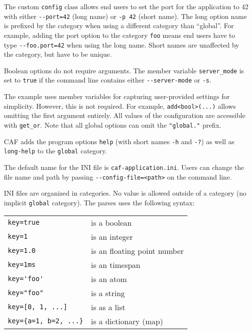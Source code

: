 The custom \lstinline^config^ class allows end users to set the port for the
application to 42 with either \lstinline^--port=42^ (long name) or \lstinline^-p
42^ (short name). The long option name is prefixed by the category when using a
different category than ``global''. For example, adding the port option to the
category \lstinline^foo^ means end users have to type \lstinline^--foo.port=42^
when using the long name. Short names are unaffected by the category, but have
to be unique.

Boolean options do not require arguments. The member variable
\lstinline^server_mode^ is set to \lstinline^true^ if the command line contains
either \lstinline^--server-mode^ or \lstinline^-s^.

The example uses member variables for capturing user-provided settings for
simplicity. However, this is not required. For example,
\lstinline^add<bool>(...)^ allows omitting the first argument entirely. All
values of the configuration are accessible with \lstinline^get_or^. Note that
all global options can omit the \lstinline^"global."^ prefix.

CAF adds the program options \lstinline^help^ (with short names \lstinline^-h^
and \lstinline^-?^) as well as \lstinline^long-help^ to the \lstinline^global^
category.

The default name for the INI file is \lstinline^caf-application.ini^. Users can
change the file name and path by passing \lstinline^--config-file=<path>^ on the
command line.

INI files are organized in categories. No value is allowed outside of a category
(no implicit \lstinline^global^ category). The parses uses the following syntax:

\begin{tabular}{ll}
  \lstinline^key=true^ & is a boolean \\
  \lstinline^key=1^ & is an integer \\
  \lstinline^key=1.0^ & is an floating point number \\
  \lstinline^key=1ms^ & is an timespan \\
  \lstinline^key='foo'^ & is an atom \\
  \lstinline^key="foo"^ & is a string \\
  \lstinline^key=[0, 1, ...]^ & is as a list \\
  \lstinline^key={a=1, b=2, ...}^ & is a dictionary (map) \\
\end{tabular}

